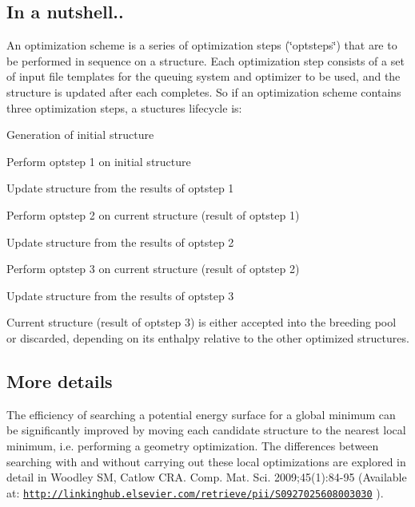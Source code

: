 \hypertarget{optschemes_quick-over}{}\subsection{In a nutshell..}\label{optschemes_quick-over}
An optimization scheme is a series of optimization steps (\char`\"{}optsteps\char`\"{}) that are to be performed in sequence on a structure. Each optimization step consists of a set of input file templates for the queuing system and optimizer to be used, and the structure is updated after each completes. So if an optimization scheme contains three optimization steps, a stucture\textquotesingle{}s lifecycle is\+:


\begin{DoxyEnumerate}
\item Generation of initial structure
\item Perform optstep 1 on initial structure
\item Update structure from the results of optstep 1
\item Perform optstep 2 on current structure (result of optstep 1)
\item Update structure from the results of optstep 2
\item Perform optstep 3 on current structure (result of optstep 2)
\item Update structure from the results of optstep 3
\item Current structure (result of optstep 3) is either accepted into the breeding pool or discarded, depending on its enthalpy relative to the other optimized structures.
\end{DoxyEnumerate}\hypertarget{optschemes_detailed-over}{}\subsection{More details}\label{optschemes_detailed-over}
The efficiency of searching a potential energy surface for a global minimum can be significantly improved by moving each candidate structure to the nearest local minimum, i.\+e. performing a geometry optimization. The differences between searching with and without carrying out these local optimizations are explored in detail in Woodley S\+M, Catlow C\+R\+A. Comp. Mat. Sci. 2009;45(1)\+:84-\/95 (Available at\+: \href{http://linkinghub.elsevier.com/retrieve/pii/S0927025608003030}{\tt http\+://linkinghub.\+elsevier.\+com/retrieve/pii/\+S0927025608003030} ).

